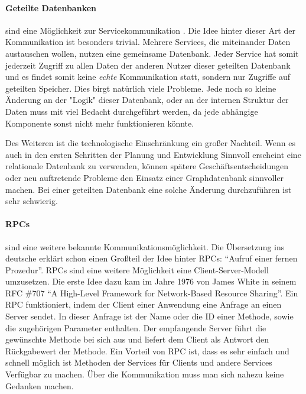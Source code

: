 \documentclass[12pt,a4paper,bibliography=totocnumbered,listof=totocnumbered]{scrartcl}
\begin{document}
\paragraph{Geteilte Datenbanken} sind eine Möglichkeit zur Servicekommunikation \cite[S.85]{buildingms}. Die Idee hinter dieser Art der Kommunikation ist besonders trivial. Mehrere Services, die miteinander Daten austauschen wollen, nutzen eine gemeinsame Datenbank. Jeder Service hat somit jederzeit Zugriff zu allen Daten der anderen Nutzer dieser geteilten Datenbank und es findet somit keine \textit{echte} Kommunikation statt, sondern nur Zugriffe auf geteilten Speicher.\cite{shareddb}
Dies birgt natürlich viele Probleme. Jede noch so kleine Änderung an der "Logik" dieser Datenbank, oder an der internen Struktur der Daten muss mit viel Bedacht durchgeführt werden, da jede abhängige Komponente sonst nicht mehr funktionieren könnte.

Des Weiteren ist die technologische Einschränkung ein großer Nachteil. Wenn es auch in den ersten Schritten der Planung und Entwicklung Sinnvoll erscheint eine relationale Datenbank zu verwenden, können spätere Geschäftsentscheidungen oder neu auftretende Probleme den Einsatz einer Graphdatenbank sinnvoller machen. Bei einer geteilten Datenbank eine solche Änderung durchzuführen ist sehr schwierig\cite[S.85]{buildingms}.

\paragraph{\acfp{RPC}}\label{rpcpara} sind eine weitere bekannte Kommunikationsmöglichkeit. Die Übersetzung ins deutsche erklärt schon einen Großteil der Idee hinter \acp{RPC}: \enquote{Aufruf einer fernen Prozedur}. \acp{RPC} sind eine weitere Möglichkeit eine Client-Server-Modell umzusetzen. Die erste Idee dazu kam im Jahre 1976 von James White in seinem RFC \#707 \enquote{A High-Level Framework for Network-Based Resource Sharing}\cite{white707}. Ein \ac{RPC} funktioniert, indem der Client einer Anwendung eine Anfrage an einen Server sendet. In dieser Anfrage ist der Name oder die ID einer Methode, sowie die zugehörigen Parameter enthalten. Der empfangende Server führt die gewünschte Methode bei sich aus und liefert dem Client als Antwort den Rückgabewert der Methode.
Ein Vorteil von RPC ist, dass es sehr einfach und schnell möglich ist Methoden der Services für Clients und andere Services Verfügbar zu machen. Über die Kommunikation muss man sich nahezu keine Gedanken machen\cite[S.91]{buildingms}.
\end{document}
